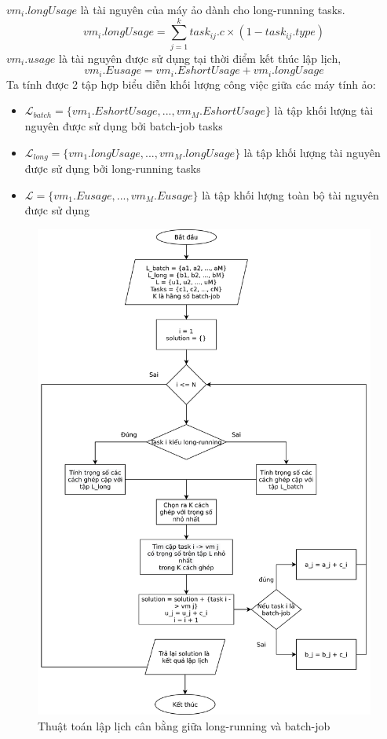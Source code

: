 \documentclass{my_style}
\begin{document}
\noindent
$vm_{i}.longUsage$ là tài nguyên của máy ảo dành cho long-running tasks.
\begin{equation}
	vm_{i}.longUsage = \sum_{j = 1}^{k}task_{ij}.c \times (1 - task_{ij}.type)
\end{equation}
$vm_{i}.usage$ là tài nguyên được sử dụng tại thời điểm kết thúc lập lịch, 
\begin{equation}
	vm_{i}.Eusage = vm_{i}.EshortUsage + vm_{i}.longUsage
\end{equation}
\newpage
Ta tính được 2 tập hợp biểu diễn khối lượng công việc giữa các máy tính ảo: 
\begin{itemize}
	\item $\mathcal{L}_{batch} = \{vm_{1}.EshortUsage, ..., vm_{M}.EshortUsage\}$ là tập khối lượng tài nguyên được sử dụng bởi batch-job tasks 
	\item $\mathcal{L}_{long} = \{vm_{1}.longUsage, ..., vm_{M}.longUsage\}$ là tập khối lượng tài nguyên được sử dụng bởi long-running tasks
	\item $\mathcal{L} = \{vm_{1}.Eusage, ..., vm_{M}.Eusage\}$ là tập khối lượng toàn bộ tài nguyên được sử dụng
\end{itemize}
\begin{figure}[h!]
	\centering
	\includegraphics[scale=0.7]{images/load_balancing_proposal.png}
	\caption{Thuật toán lập lịch cân bằng giữa long-running và batch-job}
	\label{fig:algo3}
\end{figure}
\end{document}
